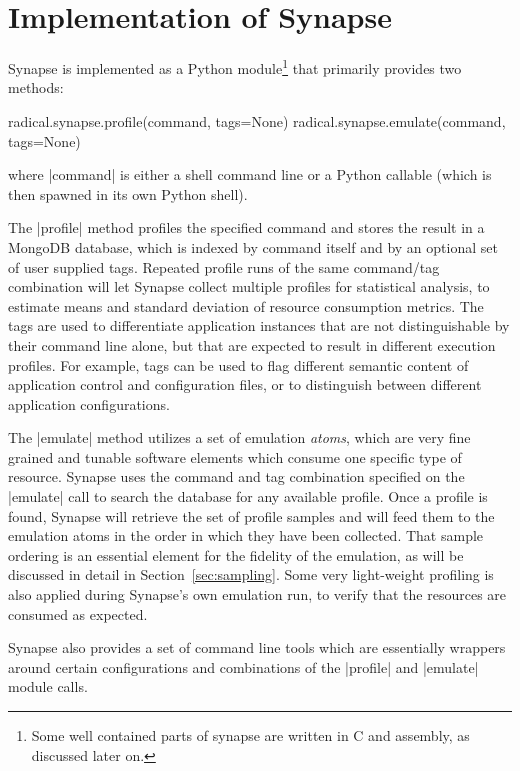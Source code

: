 \documentclass[10pt, conference, compsocconf]{IEEEtran}
\newcommand{\I}[1]{\textit{#1}\xspace}
\newcommand{\synapse}{Synapse\xspace}
\newcommand{\Synapse}{Synapse\xspace}
\begin{document}
\section{Implementation of \Synapse}
\label{sec:impl}


 \synapse is implemented as a Python module\footnote{Some well
     contained parts of synapse are written in C and assembly, as
     discussed later on.} that primarily provides two methods:

 \begin{myio}
 radical.synapse.profile(command, tags=None)
 radical.synapse.emulate(command, tags=None)
 \end{myio}

 \noindent where |command| is either a shell command line or a Python
 callable (which is then spawned in its own Python shell).
 
 The |profile| method profiles the specified command and stores the
 result in a MongoDB database, which is indexed by command itself and
 by an optional set of user supplied tags.  Repeated profile runs of
 the same command/tag combination will let \synapse collect multiple
 profiles for statistical analysis, to estimate means and standard
 deviation of resource consumption metrics.  The tags are used to
 differentiate application instances that are not distinguishable by
 their command line alone, but that are expected to result in
 different execution profiles.  For example, tags can be used to flag
 different semantic content of application control and configuration
 files, or to distinguish between different application
 configurations.

 The |emulate| method utilizes a set of emulation \I{atoms}, which are
 very fine grained and tunable software elements which consume one
 specific type of resource.  Synapse uses the command and tag
 combination specified on the |emulate| call to search the database
 for any available profile.  Once a profile is found, \synapse will
 retrieve the set of profile samples and will feed them to the
 emulation atoms in the order in which they have been collected.  That
 sample ordering is an essential element for the fidelity of the
 emulation, as will be discussed in detail in
 Section~\ref{sec:sampling}.  Some very light-weight profiling is also
 applied during \synapse's own emulation run, to verify that the
 resources are consumed as expected.

 \Synapse also provides a set of command line tools which are
 essentially wrappers around certain configurations and combinations
 of the |profile| and |emulate| module calls.
\end{document}
